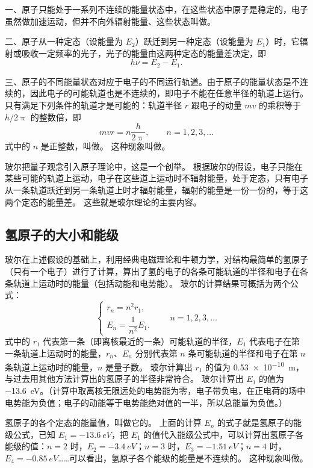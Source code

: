 一、原子只能处于一系列不连续的能量状态中，在这些状态中原子是稳定的，电子虽然做加速运动，但并不向外辐射能量、这些状态叫做。

二、原子从一种定态（设能量为 $E_2$）跃迁到另一种定态（设能量为 $E_1$）时，它辐射或吸收一定频率的光子，光子的能量由这两种定态的能量差决定，即
\[h\nu=E_2-E_1.\]

三、原子的不同能量状态对应于电子的不同运行轨道。由于原子的能量状态是不连续的，因此电子的可能轨道也是不连续的，即电子不能在任意半径的轨道上运行。
只有满足下列条件的轨道才是可能的：轨道半径 $r$ 跟电子的动量 $mv$ 的乘积等于 $h/2\uppi$ 的整数倍，即
\[mvr=n\frac{h}{2\uppi},\qquad n=1,2,3,\ldots\]
式中的 $n$ 是正整数，叫做。
这种现象叫做。

玻尔把量子观念引入原子理论中，这是一个创举。
根据玻尔的假设，电子只能在某些可能的轨道上运动，电子在这些道上运动时不辐射能量，处于定态，只有电子从一条轨道跃迁到另一条轨道上时才辐射能量，辐射的能量是一份一份的，等于这两个定态的能量差。
这些就是玻尔理论的主要内容。

\subsection{氢原子的大小和能级}

玻尔在上述假设的基础上，利用经典电磁理论和牛顿力学，对结构最简单的氢原子（只有一个电子）进行了计算，算出了氢的电子的各条可能轨道的半径和电子在各条轨道上运动时的能量（包括动能和电势能）。
玻尔的计算结果可概括为两个公式：
\[\begin{cases}
    r_n=n^2 r_1,\\
    E_n=\dfrac{1}{n^2}E_1.
\end{cases}\qquad n=1,2,3,\ldots\]
式中的 $r_1$ 代表第一条（即离核最近的一条）可能轨道的半径，$E_1$ 代表电子在第一条轨道上运动时的能量，$r_n$、$E_n$ 分别代表第 $n$ 条可能轨道的半径和电子在第 $n$ 条轨道上运动时的能量，$n$ 是量子数。
玻尔计算出 $r_1$ 的值为 \qty{0.53e-10}{m}，与过去用其他方法计算出的氢原子的半径非常符合。
玻尔计算出 $E_1$ 的值为 \qty{-13.6}{eV}。（计算中取离核无限远处的电势能为零，电子带负电，在正电荷的场中电势能为负值；电子的动能等于电势能绝对值的一半，所以总能量为负值。）

氢原子的各个定态的能量值，叫做它的。
上面的计算 $E_n$ 的式子就是氢原子的能级公式，已知 $E_1=\qty{-13.6}{eV}$，把 $E_1$ 的值代入能级公式中，可以计算出氢原子各能级的值：$n=2$ 时，$E_2=\qty{-3.4}{eV}$；$n=3$ 时，$E_3=\qty{-1.51}{eV}$；$n=4$ 时，$E_4=\qty{-0.85}{eV}$……可以看出，氢原子各个能级的能量是不连续的。
这种现象叫做。

